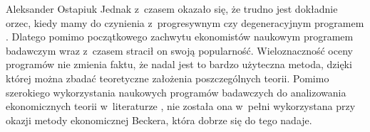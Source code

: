 \begin{artplenv}{Aleksander Ostapiuk}
Jednak z~czasem okazało się, że trudno jest dokładnie orzec, kiedy mamy do czynienia z~progresywnym czy degeneracyjnym
programem
\parencite{marchi_appraising_1991,blaug_ugly_1997,hands_second_1990}.
Dlatego pomimo początkowego zachwytu ekonomistów
naukowym programem badawczym wraz z~czasem stracił on swoją popularność. Wieloznaczność oceny programów nie zmienia
faktu, że nadal jest to bardzo użyteczna metoda, dzięki której można zbadać teoretyczne założenia poszczególnych
teorii. Pomimo szerokiego wykorzystania naukowych programów badawczych do analizowania ekonomicznych
teorii w~literaturze
\parencites[zob.][]{drakopoulos_review_2005}[s.~299–300]{hands_reflection_2001},
nie została
ona w~pełni wykorzystana przy okazji metody ekonomicznej Beckera, która dobrze się do tego nadaje. 


\end{artplenv}
